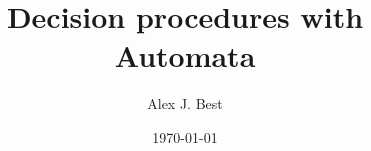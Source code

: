 
\beamertemplatenavigationsymbolsempty

\usepackage{amsmath, amssymb, amsfonts, tikz}
\usepackage[utf8]{inputenc}
\usepackage[T1]{fontenc}
\usepackage[english]{babel}

\usepackage{amsthm}
\theoremstyle{plain}
\newtheorem{theorem}{Theorem}[section]
\newtheorem{corollary}[theorem]{Corollary}
\newtheorem{lemma}[theorem]{Lemma}
\newtheorem{algorithm}[theorem]{Algorithm}
\newtheorem{proposition}[theorem]{Proposition}
\newtheorem{claim}[theorem]{Claim}
\newtheorem{fact}[theorem]{Fact}
\newtheorem{conjecture}[theorem]{Conjecture}
\theoremstyle{definition}
\newtheorem{definition}[theorem]{Definition}
\theoremstyle{definition}
\newtheorem{remark}[theorem]{Remark}
\newtheorem{observation}[theorem]{Observation}
\theoremstyle{definition}
\newtheorem{example}[theorem]{Example}
\newtheorem{question}[theorem]{Question}
\newcommand{\terminology}[1]{\textbf{#1}}

\newcommand{\NN}{\mathbb{N}}
\newcommand{\ZZ}{\mathbb{Z}}
\newcommand{\QQ}{\mathbb Q}
\newcommand{\CC}{\mathbb C}
\newcommand{\RR}{\mathbb R}
\newcommand{\FF}{\mathbb F}
\newcommand{\lt}{<}
\newcommand{\gt}{>}
\newcommand{\amp}{&}
\newcommand{\diff}{\mathop{}\!\mathrm{d}}
\newcommand{\ints}{\mathcal{O}}
\newcommand{\ideal}[1]{\mathfrak{#1}}
\usepackage{mathrsfs}\usepackage{cancel}
\newcommand{\Gal}[2]{\operatorname{Gal}(#1/#2)}
\newcommand{\absgal}[1]{\operatorname{Gal}(\overline{#1}/#1)}

\newcommand{\sheaf}[1]{\operatorname{\mathcal{#1}}}
\newcommand{\inv}{^{-1}}
\DeclareMathOperator{\norm}{Nm}
\DeclareMathOperator{\ord}{ord}
\DeclareMathOperator{\divisor}{div}
\DeclareMathOperator{\PP}{\mathbf{P}}
\DeclareMathOperator{\Hom}{Hom}
\usepackage{tikz}
\usetikzlibrary{automata, arrows.meta, positioning}


\newcommand{\lb}{[}
\newcommand{\rb}{]}

\author{Alex J. Best}
\date{\today}
\title{Decision procedures with Automata}



\maketitle

